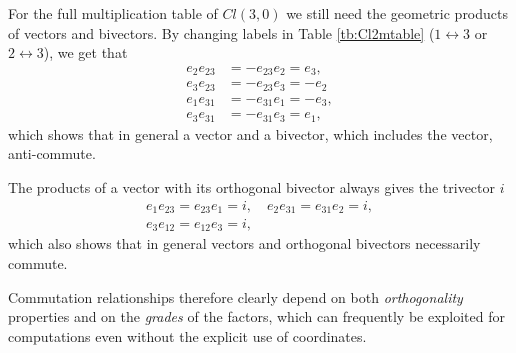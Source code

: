 \documentclass[10pt]{beamer}
\begin{document}
\begin{frame}[fragile]{}

For the full multiplication table of $Cl(3,0)$ we still need the geometric products of vectors and bivectors. By changing labels in Table \ref{tb:Cl2mtable} ($1 \leftrightarrow 3$ or $2 \leftrightarrow 3$), we get that
\begin{align} 
  e_2 e_{23} &= - e_{23}e_2 = e_3, 
  \nonumber \\
  e_3 e_{23} &= - e_{23}e_3 = -e_2
  \\
  e_1 e_{31} &= - e_{31}e_1 = -e_3, 
  \nonumber \\
  e_3 e_{31} &= - e_{31}e_3 = e_1,
\end{align} 
which shows that in general a vector and a bivector, which includes the vector, anti-commute. 


\end{frame}

\begin{frame}[fragile]{}

The products of a vector with its orthogonal bivector always gives the trivector $i$
\begin{gather} 
  e_1 e_{23} = e_{23}e_1 = i, \quad
  e_2 e_{31} = e_{31}e_2 = i,
  \nonumber \\
  e_3 e_{12} = e_{12}e_3 = i,
\end{gather} 
which also shows that in general vectors and orthogonal bivectors necessarily commute. 

Commutation relationships therefore clearly depend on both \textit{orthogonality} properties and on the \textit{grades} of the factors, which can frequently be exploited for computations even without the explicit use of coordinates. 

\end{frame}
\end{document}
